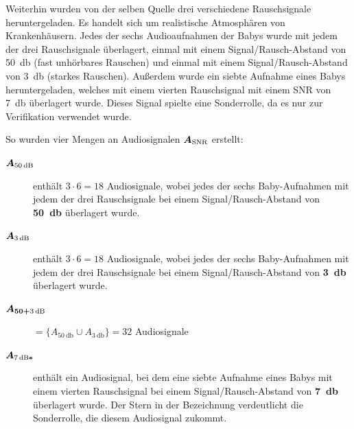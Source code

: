 Weiterhin wurden von der selben Quelle drei verschiedene Rauschsignale heruntergeladen. Es handelt sich um \glqq realistische\grqq{} Atmosphären von Krankenhäusern. Jedes der sechs Audioaufnahmen der Babys wurde mit jedem der drei Rauschsignale überlagert, einmal mit einem Signal/Rausch-Abstand von \SI{50}{\decibel} (\glqq fast unhörbares Rauschen\grqq) und einmal mit einem Signal/Rausch-Abstand von \SI{3}{\decibel} (\glqq starkes Rauschen\grqq). Außerdem wurde ein siebte Aufnahme eines Babys heruntergeladen, welches mit einem vierten Rauschsignal mit einem SNR von \SI{7}{\decibel} überlagert wurde. Dieses Signal spielte eine Sonderrolle, da es nur zur Verifikation verwendet wurde. 

So wurden vier Mengen an Audiosignalen $\boldmath{A_{\text{SNR}}}$ erstellt:

\begin{description}
	\item[$\boldmath{A_{\SI{50}{\decibel}}}$] enthält $3 \cdot 6 = 18$ Audiosignale, wobei jedes der sechs Baby-Aufnahmen mit jedem der drei Rauschsignale bei einem Signal/Rausch-Abstand von \textbf{\SI{50}{\decibel}} überlagert wurde.

	\item[$\boldmath{A_{\SI{3}{\decibel}}}$] enthält $3 \cdot 6 = 18$ Audiosignale, wobei jedes der sechs Baby-Aufnahmen mit jedem der drei Rauschsignale bei einem Signal/Rausch-Abstand von \textbf{\SI{3}{\decibel}} überlagert wurde.
	
	\item[$\boldmath{A_{50+\SI{3}{\decibel}}}$] $ = \{ A_{\SI{50}{\decibel}} \cup  A_{\SI{3}{\decibel}}\} = 32$ Audiosignale
	
	\item[$\boldmath{A_{\SI{7}{\decibel}*}}$] enthält ein Audiosignal, bei dem eine siebte Aufnahme eines Babys mit einem vierten Rauschsignal bei einem Signal/Rausch-Abstand von \textbf{\SI{7}{\decibel}} überlagert wurde. Der Stern in der Bezeichnung verdeutlicht die Sonderrolle, die diesem Audiosignal zukommt.
	
\end{description}

